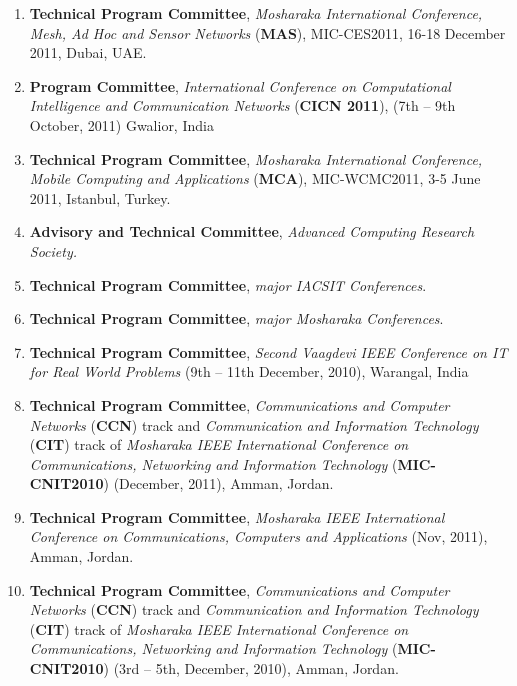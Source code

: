 \begin{enumerate}
\item
\textbf{Technical Program Committee}, \textit{Mosharaka International Conference, Mesh, Ad Hoc and Sensor Networks} (\textbf{MAS}), MIC-CES2011, 16-18 December 2011, Dubai, UAE.

\item
\textbf{Program Committee}, \textit{International Conference on Computational Intelligence and Communication Networks }(\textbf{CICN 2011}), (7th – 9th October, 2011) Gwalior, India

\item
\textbf{Technical Program Committee}, \textit{Mosharaka International Conference, Mobile Computing and Applications} (\textbf{MCA}), MIC-WCMC2011, 3-5 June 2011, Istanbul, Turkey.

\item
\textbf{Advisory and Technical Committee}, \textit{Advanced Computing Research Society.}

\item
\textbf{Technical Program Committee}, \textit{major IACSIT Conferences}.

\item
\textbf{Technical Program Committee}, \textit{major Mosharaka Conferences}.

\item
\textbf{Technical Program Committee}, \textit{Second Vaagdevi IEEE Conference on IT for Real World Problems} (9th – 11th December, 2010), Warangal, India

\item
\textbf{Technical Program Committee}, \textit{Communications and Computer Networks} (\textbf{CCN}) track and \textit{Communication and Information Technology} (\textbf{CIT}) track of\textit{ Mosharaka IEEE International Conference on Communications, Networking and Information Technology} (\textbf{MIC-CNIT2010}) (December, 2011), Amman, Jordan.

\item
\textbf{Technical Program Committee}, \textit{Mosharaka IEEE International Conference on Communications, Computers and Applications} (Nov, 2011), Amman, Jordan.

\item
\textbf{Technical Program Committee}, \textit{Communications and Computer Networks} (\textbf{CCN}) track and \textit{Communication and Information Technology} (\textbf{CIT}) track of \textit{Mosharaka IEEE International Conference on Communications, Networking and Information Technology} (\textbf{MIC-CNIT2010}) (3rd – 5th, December, 2010), Amman, Jordan.


\end{enumerate}
